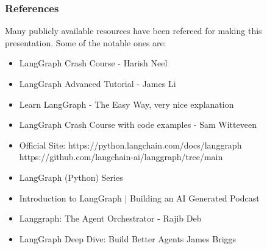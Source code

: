 

\begin{frame}\frametitle{References}
Many publicly available resources have been refereed for making this presentation. Some of the notable ones are:
\footnotesize
\begin{itemize}
\item LangGraph Crash Course - Harish Neel
\item LangGraph Advanced Tutorial  - James Li
\item Learn LangGraph - The Easy Way, very nice explanation
\item LangGraph Crash Course with code examples - Sam Witteveen 
\item Official Site: https://python.langchain.com/docs/langgraph https://github.com/langchain-ai/langgraph/tree/main
\item LangGraph (Python) Series
\item Introduction to LangGraph | Building an AI Generated Podcast 
\item Langgraph: The Agent Orchestrator - Rajib Deb 
\item LangGraph Deep Dive: Build Better Agents James Briggs 
\end{itemize}

\end{frame}